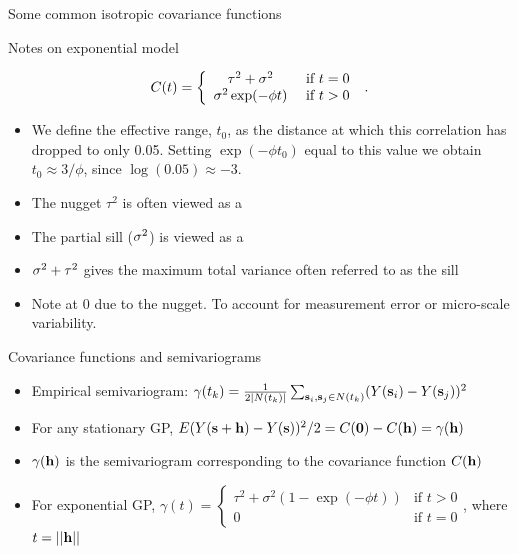 \begin{frame}{Some common isotropic covariance functions}
\begin{table}[t]
\begin{center}
		\end{center}
	\end{table}
\end{frame}

\begin{frame}{Notes on exponential model}
	
	$$
	C(t) = \left \{ \begin{array}{cl}
	\tau^2 + \sigma^2 &  \mbox{  if }t=0\\
	\sigma^2 \exp(-\phi t) &  \mbox{  if }t>0\\
	\end{array}\right . \; .
	$$%
	
	\begin{itemize}
		
		\item We define the \alert{effective range},  
		$t_0$, as the distance at which this correlation has dropped to
		only 0.05. Setting $\exp(-\phi t_0)$ equal to this value we obtain
		$t_0 \approx 3/\phi$, since $\log(0.05) \approx -3$. %
		
		\item The \alert{nugget} $\tau^2$ is often viewed as a 
		
		\item The  \alert{partial sill} ($\sigma^2$) is viewed as a  %
		
		\item $\sigma^2 + \tau^2$ gives the maximum total variance often referred to as the \alert{sill}
		
		\item Note  at $0$ due to the nugget.   To account for measurement error or micro-scale variability.
	\end{itemize}
\end{frame}


\begin{frame}{Covariance functions and semivariograms}
	\begin{itemize}
		\item {} Empirical semivariogram: $\gamma(t_k) = \frac{1}{2|N(t_k)|}\sum_{\textbf{s}_i,\textbf{s}_j \in
		N(t_k)}(Y(\textbf{s}_i)-Y(\textbf{s}_j))^2$ 
	\item For any stationary GP, $E(Y(\textbf{s}+\textbf{h})-Y(\textbf{s}))^2/2 = C(\textbf{0})-C(\textbf{h}) = \gamma(\textbf{h})$
	\item $\gamma(\textbf{h})$ is the \alert{semivariogram} corresponding to the covariance function $C(\textbf{h})$
	\item {} For exponential GP, $\gamma(t) = 
	\left \{ \begin{array} {cl}%
	\tau^{2}+\sigma^{2}(1-\exp(-\phi t)) & \mbox{if } t>0\\
	0 & \mbox{if } t=0
	\end{array} \right .$, where $t=||\textbf{h}||$
	\end{itemize}
\end{frame}

